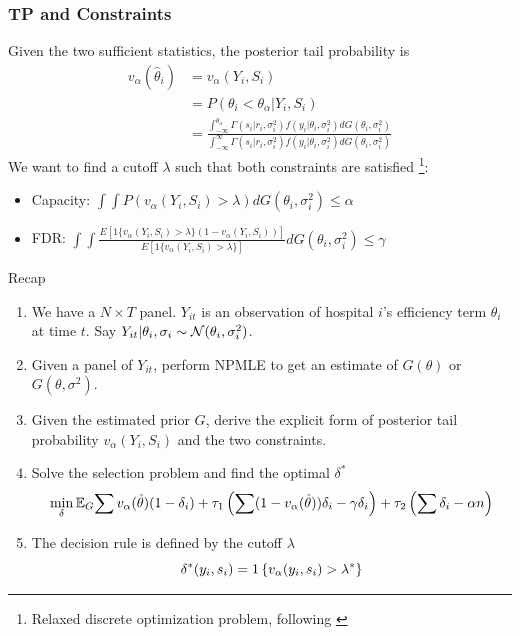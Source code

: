 \documentclass[10pt,mathserif,aspectratio=169]{beamer}
\begin{document}
\begin{frame}
  \frametitle{TP and Constraints}
  Given the two sufficient statistics, the posterior tail probability is
  \begin{align*}
    v_\alpha(\hat{\theta}_i) & =v_\alpha(Y_i,S_i)                                                                                                         \\
                             & = P( \theta_i < \theta_{\alpha} | Y_i,S_i)                                                                                 \\
                             & = \frac{{\int_{-\infty}^{\theta_{\alpha}} \Gamma(s_i|r_i,\sigma_i^2) f(y_i|\theta_i, \sigma_i^2) dG(\theta_i,\sigma_i^2)}}
    {{\int_{-\infty}^{\infty} \Gamma(s_i|r_i,\sigma_i^2) f(y_i|\theta_i, \sigma_i^2) dG(\theta_i,\sigma_i^2)}}
  \end{align*}
  We want to find a cutoff $\lambda$ such that both constraints are satisfied \footnote{Relaxed discrete optimization problem, following \citep{basu2018weighted}}:\\
  \begin{itemize}\itemsep=8pt
    \item Capacity: $\int \int P(v_\alpha(Y_i, S_i) > \lambda) dG(\theta_i,\sigma_i^2)
            \leq \alpha$
    \item FDR: $\int \int
            \frac{E[1\{v_\alpha(Y_i,S_i)>\lambda\}(1-v_\alpha(Y_i,S_i))]}{E[1\{v_\alpha(Y_i,S_i)>\lambda\}]}
            dG(\theta_i,\sigma_i^2) \leq \gamma$
  \end{itemize}
\end{frame}

\begin{frame}{Recap}

  \begin{enumerate}
    \item We have a $N\times T$ panel. $Y_{it}$ is an observation of hospital $i$'s
          efficiency term $\theta_i$ at time $t$. Say $Y_{it}|\theta_i,\sigma_i \sim
            \mathcal{N}(\theta_i,\sigma_i^2)$.
    \item Given a panel of $Y_{it}$, perform NPMLE to get an estimate of $G(\theta)$ or
          $G(\theta,\sigma^2)$.
    \item Given the estimated prior $G$, derive the explicit form of posterior tail
          probability $v_\alpha(Y_i,S_i)$ and the two constraints.
    \item Solve the selection problem and find the optimal $\delta^*$
          \begin{equation*}
            \min_{\delta}\mathbb{E}_G{\sum v_\alpha(\hat{\theta})(1-\delta_i) +\tau_1\left(\sum (1-v_\alpha(\hat{\theta}))\delta_i -\gamma \delta_i\right) + \tau_2 \left(\sum \delta_i -\alpha n\right)}
          \end{equation*}
    \item The decision rule is defined by the cutoff $\lambda$
          \[\delta^*(y_i,s_i)=1\left\{v_\alpha(y_i,s_i)>\lambda^*\right\}\]
  \end{enumerate}
\end{frame}
\end{document}

